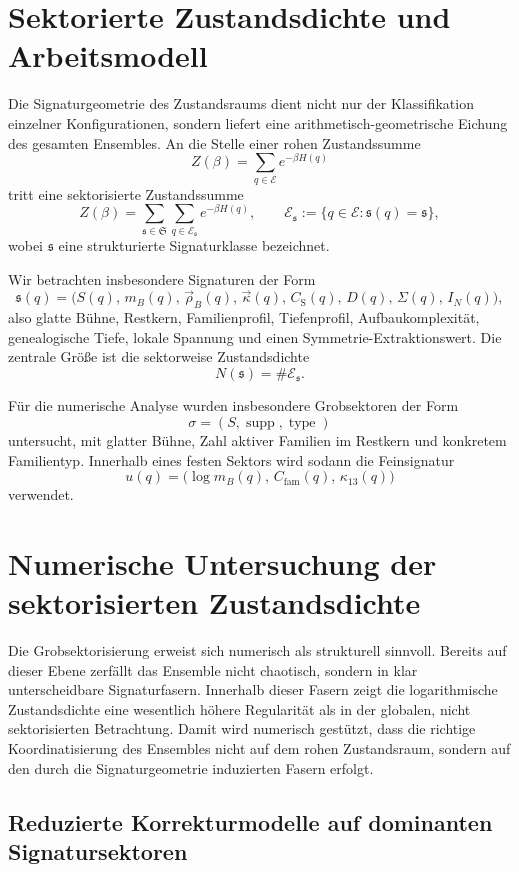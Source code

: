 \documentclass[11pt,a4paper]{article}
\theoremstyle{definition}
\theoremstyle{remark}
\begin{document}
\section{Sektorierte Zustandsdichte und Arbeitsmodell}

Die Signaturgeometrie des Zustandsraums dient nicht nur der Klassifikation einzelner Konfigurationen, sondern liefert eine arithmetisch-geometrische Eichung des gesamten Ensembles. An die Stelle einer rohen Zustandssumme
\[
Z(\beta)=\sum_{q\in\mathcal E} e^{-\beta H(q)}
\]
tritt eine sektorisierte Zustandssumme
\[
Z(\beta)
=
\sum_{\mathfrak s\in\mathfrak S}
\sum_{q\in \mathcal E_{\mathfrak s}}
e^{-\beta H(q)},
\qquad
\mathcal E_{\mathfrak s}
:=
\{q\in\mathcal E:\mathfrak s(q)=\mathfrak s\},
\]
wobei \(\mathfrak s\) eine strukturierte Signaturklasse bezeichnet.

Wir betrachten insbesondere Signaturen der Form
\[
\mathfrak s(q)
=
\bigl(
S(q),\,m_B(q),\,\vec\rho_B(q),\,\vec\kappa(q),\,C_{\mathrm S}(q),\,D(q),\,\Sigma(q),\,I_N(q)
\bigr),
\]
also glatte Bühne, Restkern, Familienprofil, Tiefenprofil, Aufbaukomplexität, genealogische Tiefe, lokale Spannung und einen Symmetrie-Extraktionswert. Die zentrale Größe ist die sektorweise Zustandsdichte
\[
N(\mathfrak s)=\#\mathcal E_{\mathfrak s}.
\]

Für die numerische Analyse wurden insbesondere Grobsektoren der Form
\[
\sigma=(S,\operatorname{supp},\operatorname{type})
\]
untersucht, mit glatter Bühne, Zahl aktiver Familien im Restkern und konkretem Familientyp. Innerhalb eines festen Sektors wird sodann die Feinsignatur
\[
u(q)=\bigl(\log m_B(q),\,C_{\mathrm{fam}}(q),\,\kappa_{13}(q)\bigr)
\]
verwendet.

\section{Numerische Untersuchung der sektorisierten Zustandsdichte}

Die Grobsektorisierung erweist sich numerisch als strukturell sinnvoll. Bereits auf dieser Ebene zerfällt das Ensemble nicht chaotisch, sondern in klar unterscheidbare Signaturfasern. Innerhalb dieser Fasern zeigt die logarithmische Zustandsdichte eine wesentlich höhere Regularität als in der globalen, nicht sektorisierten Betrachtung. Damit wird numerisch gestützt, dass die richtige Koordinatisierung des Ensembles nicht auf dem rohen Zustandsraum, sondern auf den durch die Signaturgeometrie induzierten Fasern erfolgt.

\subsection{Reduzierte Korrekturmodelle auf dominanten Signatursektoren}
\end{document}
